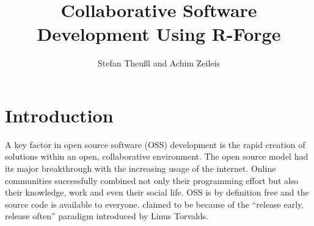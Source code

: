 \title{Collaborative Software Development Using R-Forge}
\author{Stefan Theu\ss{}l and Achim Zeileis}

\maketitle



\newcommand{\tab}[1]{{\normalfont\textit{#1}}}

\section*{Introduction}


A key factor in open source software (OSS) development is the rapid creation
of solutions within an open, collaborative environment. The open
source model had its major breakthrough with the increasing
usage of the internet. Online communities successfully combined
not only their programming effort but also their knowledge, work
and even their social life. OSS is by definition free and
the source code is available to everyone.
claimed to be  because of the
``release early, release often'' paradigm introduced by Linus
Torvalds.


